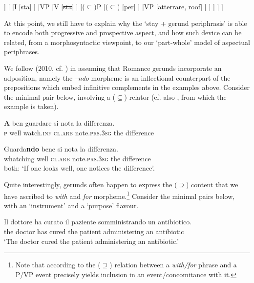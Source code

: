 \documentclass[output=paper,modfonts,nonflat,newtxmath,colorlinks,citecolor=brown]{langsci/langscibook}
\begin{document}
  \ea  \label{ex:franco:26}
    \begin{forest}
    [IP
    		[DP
    			[L'aereo]
    		]
    		[
    			[I
    				[sta]
    			]
    			[VP
    				[V
    					[\sout{sta}]
    				]
    				[($\subseteq$)P
    					[($\subseteq$)
    						[per]
    					]
    					[VP
    						[atterrare, roof]
    					]
    				]
    			]
    		]
    	]
    	\end{forest}
    \z


At this point, we still have to explain why the ‘stay + gerund periphrasis’ is able to encode both progressive and prospective aspect, and how such device can be related, from a morphosyntactic viewpoint, to our ‘part-whole’ model of aspectual periphrases.

We follow \citeauthor{Gallego2010} (2010, cf. \citealt{Mateu2002, Franco2015}) in assuming that Romance gerunds incorporate an adposition, namely the –\textit{ndo} morpheme is an inflectional counterpart of the prepositions which embed infinitive complements in the examples above. Consider the minimal pair below, involving a (${\subseteq}$) relator (cf. also \citealt{Casalicchio2013}, from which the example  is taken). %

\ea%
    \label{ex:franco:27}
    \ea \label{ex:franco:27a}
    \gll \textbf{A} ben guardare si nota la differenza.\\
        \textsc{p} well watch.\textsc{inf} \textsc{cl.arb} note.\textsc{prs.3sg} the difference\\
    \glt

     \ex \label{ex:franco:27b}
    \gll  Guarda\textbf{ndo} bene si nota la differenza.\\
       whatching well \textsc{cl.arb} note.\textsc{prs.3sg} the difference\\
    \glt both: `If one looks well, one notices the difference’.
    \z
    \z



Quite interestingly, gerunds often happen to express the (${\supseteq}$) content that we have ascribed to \textit{with} and \textit{for} morpheme.\footnote{Note that according to \citealt{FrancoManzini2017Ins} the (\textrm{${\supseteq}$}) relation between a \textit{with/for} phrase and a \liv P/VP event precisely yields inclusion in an event/concomitance with it.} Consider the minimal pairs below, with an ‘instrument’  and a ‘purpose’  flavour.

\ea%
    \label{ex:franco:28}
    \ea \label{ex:franco:28a}
    \gll  Il dottore ha curato il paziente somministrando un antibiotico.\\
        the doctor has cured the patient administering an antibiotic\\
    \glt ‘The doctor cured the patient administering an antibiotic.’
\end{document}

